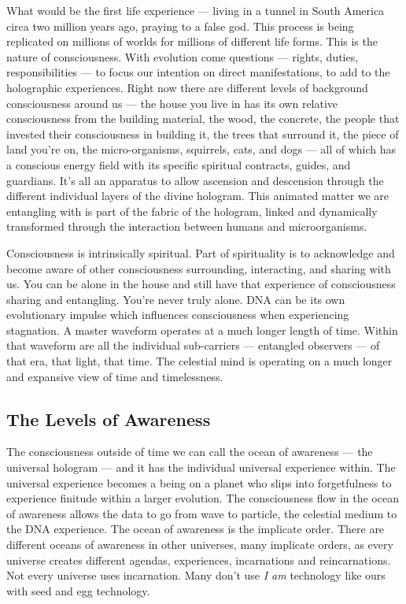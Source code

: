 What would be the first life experience --- living in a tunnel in South
America circa two million years ago, praying to a false god. This
process is being replicated on millions of worlds for millions of
different life forms. This is the nature of consciousness. With
evolution come questions --- rights, duties, responsibilities --- to
focus our intention on direct manifestations, to add to the holographic
experiences. Right now there are different levels of background
consciousness around us --- the house you live in has its own relative
consciousness from the building material, the wood, the concrete, the
people that invested their consciousness in building it, the trees that
surround it, the piece of land you're on, the micro-organisms,
squirrels, cats, and dogs --- all of which has a conscious energy field
with its specific spiritual contracts, guides, and guardians. It's all
an apparatus to allow ascension and descension through the different
individual layers of the divine hologram. This animated matter we are
entangling with is part of the fabric of the hologram, linked and
dynamically transformed through the interaction between humans and
microorganisms.

Consciousness is intrinsically spiritual. Part of spirituality is to
acknowledge and become aware of other consciousness surrounding,
interacting, and sharing with us. You can be alone in the house and
still have that experience of consciousness sharing and entangling.
You're never truly alone. DNA can be its own evolutionary impulse which
influences consciousness when experiencing stagnation. A master waveform
operates at a much longer length of time. Within that waveform are all
the individual sub-carriers --- entangled observers --- of that era,
that light, that time. The celestial mind is operating on a much longer
and expansive view of time and timelessness.

\subsection{The Levels of Awareness}\label{the-levels-of-awareness}

The consciousness outside of time we can call the ocean of awareness ---
the universal hologram --- and it has the individual universal
experience within. The universal experience becomes a being on a planet
who slips into forgetfulness to experience finitude within a larger
evolution. The consciousness flow in the ocean of awareness allows the
data to go from wave to particle, the celestial medium to the DNA
experience. The ocean of awareness is the implicate order. There are
different oceans of awareness in other universes, many implicate orders,
as every universe creates different agendas, experiences, incarnations
and reincarnations. Not every universe uses incarnation. Many don't use
\emph{I am} technology like ours with seed and egg technology.

